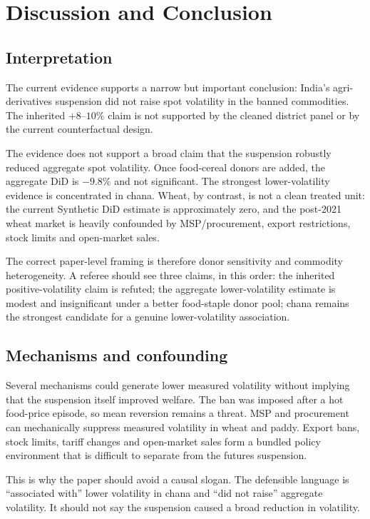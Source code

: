\section{Discussion and Conclusion}
\label{sec:discussion}

\subsection{Interpretation}

The current evidence supports a narrow but important conclusion: India's agri-derivatives
suspension did not raise spot volatility in the banned commodities. The inherited
$+8$--$10\%$ claim is not supported by the cleaned district panel or by the current
counterfactual design.

The evidence does not support a broad claim that the suspension robustly reduced aggregate
spot volatility. Once food-cereal donors are added, the aggregate DiD is $-9.8\%$ and not
significant. The strongest lower-volatility evidence is concentrated in chana. Wheat, by
contrast, is not a clean treated unit: the current Synthetic DiD estimate is approximately
zero, and the post-2021 wheat market is heavily confounded by MSP/procurement, export
restrictions, stock limits and open-market sales.

The correct paper-level framing is therefore donor sensitivity and commodity heterogeneity.
A referee should see three claims, in this order: the inherited positive-volatility claim is
refuted; the aggregate lower-volatility estimate is modest and insignificant under a better
food-staple donor pool; chana remains the strongest candidate for a genuine lower-volatility
association.

\subsection{Mechanisms and confounding}

Several mechanisms could generate lower measured volatility without implying that the
suspension itself improved welfare. The ban was imposed after a hot food-price episode, so
mean reversion remains a threat. MSP and procurement can mechanically suppress measured
volatility in wheat and paddy. Export bans, stock limits, tariff changes and open-market
sales form a bundled policy environment that is difficult to separate from the futures
suspension.

This is why the paper should avoid a causal slogan. The defensible language is
``associated with'' lower volatility in chana and ``did not raise'' aggregate volatility.
It should not say the suspension caused a broad reduction in volatility.

